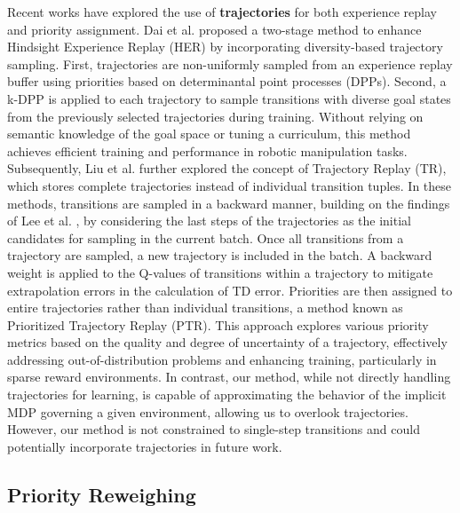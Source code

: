 Recent works have explored the use of \textbf{trajectories} for both experience replay and priority assignment. Dai et al. \cite{dai2021diversity} proposed a two-stage method to enhance Hindsight Experience Replay (HER) by incorporating diversity-based trajectory sampling. First, trajectories are non-uniformly sampled from an experience replay buffer using priorities based on determinantal point processes (DPPs). Second, a k-DPP is applied to each trajectory to sample transitions with diverse goal states from the previously selected trajectories during training. Without relying on semantic knowledge of the goal space or tuning a curriculum, this method achieves efficient training and performance in robotic manipulation tasks. Subsequently, Liu et al. \cite{liu2023prioritized} further explored the concept of Trajectory Replay (TR), which stores complete trajectories instead of individual transition tuples. In these methods, transitions are sampled in a backward manner, building on the findings of Lee et al. \cite{lee2019sample}, by considering the last steps of the trajectories as the initial candidates for sampling in the current batch. Once all transitions from a trajectory are sampled, a new trajectory is included in the batch. A backward weight is applied to the Q-values of transitions within a trajectory to mitigate extrapolation errors in the calculation of TD error. Priorities are then assigned to entire trajectories rather than individual transitions, a method known as Prioritized Trajectory Replay (PTR). This approach explores various priority metrics based on the quality and degree of uncertainty of a trajectory, effectively addressing out-of-distribution problems and enhancing training, particularly in sparse reward environments. In contrast, our method, while not directly handling trajectories for learning, is capable of approximating the behavior of the implicit MDP governing a given environment, allowing us to overlook trajectories. However, our method is not constrained to single-step transitions and could potentially incorporate trajectories in future work.



\subsection{Priority Reweighing}

